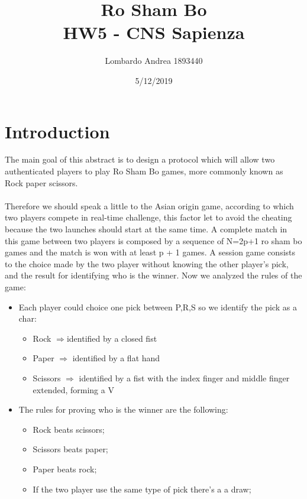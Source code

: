 \documentclass[11pt,a4paper]{article}
\title{Ro Sham Bo\\ HW5 - CNS Sapienza}
\author{Lombardo Andrea 1893440 }
\date{5/12/2019}
\begin{document}
\maketitle
\newpage

	\section{Introduction}
	The main goal of this abstract is to design a protocol which will allow two authenticated players to play Ro Sham Bo games, more commonly known as Rock paper scissors.    \\   \\
	
	Therefore we should speak a little to the  Asian origin game, according to which two players compete in real-time challenge, this factor let to avoid the cheating because the two launches should start at the same time.
	A complete match in this game between two players is composed by a sequence of N=2p+1 ro sham bo games and the match is won with at least p + 1 games.
	A session game consists to the choice made by the two player without knowing the other player's pick, and the result for identifying who is the winner. Now we analyzed the rules of the game:
	\begin{itemize}
	    
		\item Each player could choice one pick between P,R,S so we identify the pick as a char: 
		\begin{itemize}
\item Rock $\Rightarrow$identified by a closed fist\\
\item Paper $\Rightarrow$ identified by a flat hand\\
\item Scissors $\Rightarrow$ identified by a fist with the index finger and middle finger extended, forming a V\\
		\end{itemize}
		
		\item The rules for proving who is the winner are the following:
		\begin{itemize}
			\item Rock beats scissors;
			\item Scissors beats paper;
			\item Paper beats rock;
			\item If the two player use the same type of pick there's a  a draw;
		\end{itemize}
	\end{itemize}
	
\end{document}
